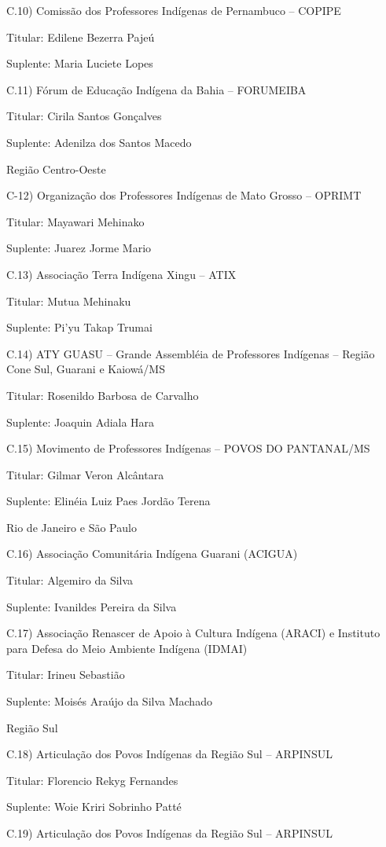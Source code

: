 \documentclass[
]{book}
\begin{document}
C.10) Comissão dos Professores Indígenas de Pernambuco -- COPIPE

Titular: Edilene Bezerra Pajeú

Suplente: Maria Luciete Lopes

C.11) Fórum de Educação Indígena da Bahia -- FORUMEIBA

Titular: Cirila Santos Gonçalves

Suplente: Adenilza dos Santos Macedo

Região Centro-Oeste

C-12) Organização dos Professores Indígenas de Mato Grosso -- OPRIMT

Titular: Mayawari Mehinako

Suplente: Juarez Jorme Mario

C.13) Associação Terra Indígena Xingu -- ATIX

Titular: Mutua Mehinaku

Suplente: Pi'yu Takap Trumai

C.14) ATY GUASU -- Grande Assembléia de Professores Indígenas -- Região Cone Sul, Guarani e Kaiowá/MS

Titular: Rosenildo Barbosa de Carvalho

Suplente: Joaquin Adiala Hara

C.15) Movimento de Professores Indígenas -- POVOS DO PANTANAL/MS

Titular: Gilmar Veron Alcântara

Suplente: Elinéia Luiz Paes Jordão Terena

Rio de Janeiro e São Paulo

C.16) Associação Comunitária Indígena Guarani (ACIGUA)

Titular: Algemiro da Silva

Suplente: Ivanildes Pereira da Silva

C.17) Associação Renascer de Apoio à Cultura Indígena (ARACI) e Instituto para Defesa do Meio Ambiente Indígena (IDMAI)

Titular: Irineu Sebastião

Suplente: Moisés Araújo da Silva Machado

Região Sul

C.18) Articulação dos Povos Indígenas da Região Sul -- ARPINSUL

Titular: Florencio Rekyg Fernandes

Suplente: Woie Kriri Sobrinho Patté

C.19) Articulação dos Povos Indígenas da Região Sul -- ARPINSUL
\end{document}
